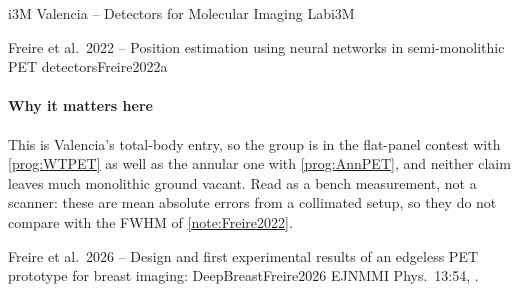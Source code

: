 \begin{programnote}{i3M Valencia -- Detectors for Molecular Imaging Lab}{i3M}
\begin{papernote}{Freire et al.\ 2022 -- Position estimation using neural networks in semi-monolithic PET detectors}{Freire2022a}
\paragraph{Why it matters here}
This is Valencia's total-body entry, so the group is in the flat-panel
contest with \ref{prog:WTPET} as well as the annular one with
\ref{prog:AnnPET}, and neither claim leaves much monolithic ground vacant.
Read as a bench measurement, not a scanner: these are mean absolute errors
from a collimated setup, so they do not compare with the  FWHM of
\ref{note:Freire2022}.

\end{papernote}

\begin{papernote}{Freire et al.\ 2026 -- Design and first experimental results of an edgeless PET prototype for breast imaging: DeepBreast}{Freire2026}
EJNMMI Phys.\ 13:54, .


\end{papernote}
\end{programnote}
